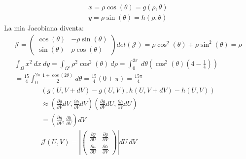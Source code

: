 \documentclass[a4paper, oneside]{article}
\begin{document}
\begin{gather*}
    x = \rho \cos(\theta) = g(\rho , \theta)\\
    y = \rho \sin(\theta) = h(\rho , \theta)
\end{gather*}
La mia Jacobiana diventa:
\begin{gather*}
    \mathcal{J} = \begin{pmatrix}
        \cos(\theta) & -\rho \sin(\theta)\\
        \sin(\theta) & \rho \cos(\theta)
    \end{pmatrix}
    det(\mathcal{J}) = \rho \cos^2(\theta) + \rho \sin^2(\theta) = \rho\\
    \int_{\Omega} x^2 \ dx \ dy = \int_{\Omega'} \rho^2 \cos^2(\theta) \ d\rho = \int_{0}^{2\pi} \ d\theta (\cos^2(\theta) (4-\frac{1}{4}))\\
    = \frac{15}{4} \int_{0}^{2\pi} \frac{1+\cos(2\theta)}{2} \ d\theta = \frac{15}{4} (0 + \pi) = \frac{15\pi}{4}
\end{gather*}
\begin{gather*}
    \left(g(U,V+dV)-g(U,V), h(U,V+dV)-h(U,V)\right) \\
    \approx \left( \frac{\partial g}{\partial V} dV, \frac{\partial h}{\partial V} dV \right) \left( \frac{\partial g}{\partial V} dU, \frac{\partial h}{\partial V} dU \right)\\
    = \left( \frac{\partial g}{\partial V}, \frac{\partial h}{\partial V} \right) dV\\
    \mathcal{J} (U,V) = \left\lvert \begin{pmatrix}
        \frac{\partial g}{\partial U} & \frac{\partial g}{\partial V}\\
        \frac{\partial h}{\partial U} & \frac{\partial h}{\partial V}
    \end{pmatrix}\right\rvert dU \ dV
\end{gather*}
\end{document}
